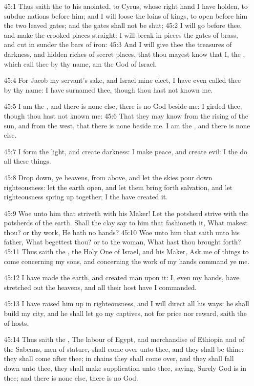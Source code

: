 45:1 Thus saith the \LORD to his anointed, to Cyrus, whose right hand I
have holden, to subdue nations before him; and I will loose the loins
of kings, to open before him the two leaved gates; and the gates shall
not be shut; 45:2 I will go before thee, and make the crooked places
straight: I will break in pieces the gates of brass, and cut in sunder
the bars of iron: 45:3 And I will give thee the treasures of darkness,
and hidden riches of secret places, that thou mayest know that I, the
\LORD, which call thee by thy name, am the God of Israel.

45:4 For Jacob my servant's sake, and Israel mine elect, I have even
called thee by thy name: I have surnamed thee, though thou hast not
known me.

45:5 I am the \LORD, and there is none else, there is no God beside me:
I girded thee, though thou hast not known me: 45:6 That they may know
from the rising of the sun, and from the west, that there is none
beside me. I am the \LORD, and there is none else.

45:7 I form the light, and create darkness: I make peace, and create
evil: I the \LORD do all these things.

45:8 Drop down, ye heavens, from above, and let the skies pour down
righteousness: let the earth open, and let them bring forth salvation,
and let righteousness spring up together; I the \LORD have created it.

45:9 Woe unto him that striveth with his Maker! Let the potsherd
strive with the potsherds of the earth. Shall the clay say to him that
fashioneth it, What makest thou? or thy work, He hath no hands?  45:10
Woe unto him that saith unto his father, What begettest thou? or to
the woman, What hast thou brought forth?  45:11 Thus saith the \LORD,
the Holy One of Israel, and his Maker, Ask me of things to come
concerning my sons, and concerning the work of my hands command ye me.

45:12 I have made the earth, and created man upon it: I, even my
hands, have stretched out the heavens, and all their host have I
commanded.

45:13 I have raised him up in righteousness, and I will direct all his
ways: he shall build my city, and he shall let go my captives, not for
price nor reward, saith the \LORD of hosts.

45:14 Thus saith the \LORD, The labour of Egypt, and merchandise of
Ethiopia and of the Sabeans, men of stature, shall come over unto
thee, and they shall be thine: they shall come after thee; in chains
they shall come over, and they shall fall down unto thee, they shall
make supplication unto thee, saying, Surely God is in thee; and there
is none else, there is no God.

